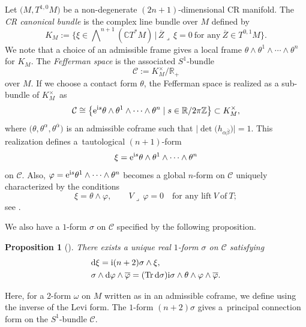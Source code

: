 \documentclass[pdftex]{sigma}
\renewcommand\a{\alpha}
\renewcommand\b{\beta}
\renewcommand\th{\theta}
\newcommand\ol{\overline}
\numberwithin{equation}{section}
\newtheorem{Proposition}[Theorem]{Proposition}
 { \theoremstyle{definition}
\newtheorem{Definition}[Theorem]{Definition}
\newtheorem*{Notation}{Notation}
\newtheorem{Example}[Theorem]{Example}
\newtheorem{Remark}[Theorem]{Remark} }
\begin{document}
Let $\bigl(M, T^{1, 0}M\bigr)$ be a non-degenerate $(2n+1)$-dimensional CR manifold.
The {\it CR canonical bundle} is the complex line bundle over $M$ defined by
\[
K_M:=\biggl\{\xi\in\bigwedge\nolimits^{\!n+1}(\mathbb{C}T^*M)\, \Big|\, \ol Z\lrcorner\, \xi=0\ \textrm{for any}\ \ol Z\in T^{0,1}M\biggr\}.
\]
We note that a choice of an admissible frame gives a local frame $\th\wedge\th^1\wedge\cdots\wedge\th^n$ for $K_M$. The {\it Fefferman space} is the associated $S^1$-bundle
\[
\mathcal{C}:=K^\times_M/\mathbb{R}_+
\]
over $M$. If we choose a contact form $\th$, the Fefferman space is realized as a sub-bundle of $K^\times_M$~as%
\begin{equation}\label{embed-C}
\mathcal{C}\cong \bigl\{{\rm e}^{{\rm i}s}\th\wedge\th^1\wedge\cdots\wedge\th^n\mid s\in \mathbb{R}/2\pi\mathbb{Z}\bigr\} \subset K^\times_M,
\end{equation}
where $\bigl(\th, \th^\a, \th^{\ol\a}\bigr)$ is an admissible coframe such that $\bigl|\det\bigl(h_{\a\ol\b}\bigr)\bigr|=1$. This realization defines a~tautological $(n+1)$-form
\[
\xi={\rm e}^{{\rm i}s}\th\wedge\th^1\wedge\cdots\wedge\th^n
\]
on $\mathcal{C}$. Also, $\varphi={\rm e}^{{\rm i}s}\th^1\wedge\cdots\wedge\th^n$ becomes a global $n$-form on $\mathcal{C}$ uniquely characterized by the conditions
\[
\xi=\th\wedge\varphi, \qquad V\lrcorner\, \varphi=0\quad \text{for any lift}\ V\ \text{of}\ T;
\]
see {\cite[Lemma 3.3]{Lee}}.

We also have a $1$-form $\sigma$ on $\mathcal{C}$ specified by the following proposition.

\begin{Proposition}[{\cite[Proposition 3.4]{Lee}}]\label{sigma-condition}
There exists a unique real $1$-form $\sigma$ on $\mathcal{C}$ satisfying
\begin{align*}
&{\rm d}\xi={\rm i}(n+2)\sigma\wedge\xi, \\
&\sigma\wedge {\rm d}\varphi\wedge\ol\varphi=(\operatorname{Tr} {\rm d}\sigma){\rm i}\sigma\wedge\th\wedge\varphi\wedge\ol\varphi.
\end{align*}
\end{Proposition}
Here, for a 2-form $\omega$ on $M$ written as \smash{$\omega={\rm i}\omega_{\a\ol\b}\th^\a\wedge\th^{\ol\b}+\cdots$} in an admissible coframe, we define
\smash{$\operatorname{Tr} \omega:=h^{\a\ol\b}\omega_{\a\ol\b}$} using the inverse \smash{$h^{\a\ol\b}$} of the Levi form. The $1$-form $(n+2)\sigma$ gives a~principal connection form on the $S^1$-bundle $\mathcal{C}$.
\end{document}
